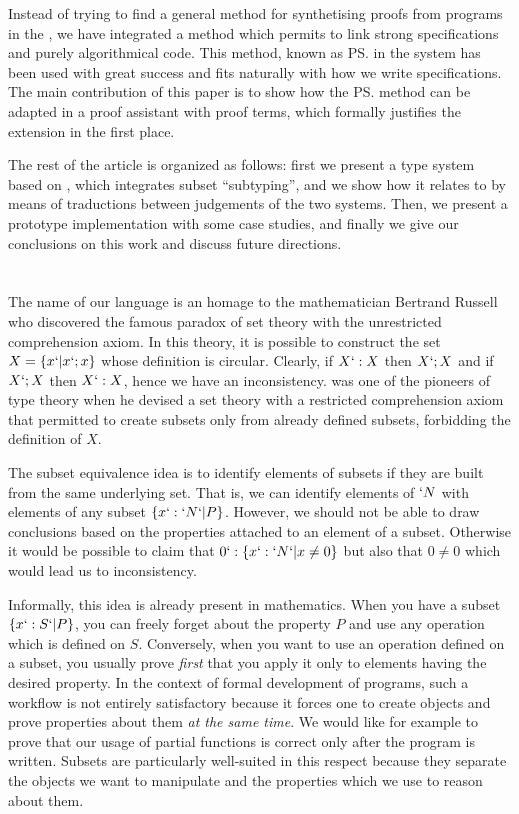 \documentclass{llncs}
\begin{document}
Instead of trying to find a general method for synthetising proofs from
programs in the \CICfull, we have integrated a method which permits to
link strong specifications and purely algorithmical code. This method,
known as \ps{} in the \PVS{} system has been used with great success and
fits naturally with how we write specifications. The main contribution
of this paper is to show how the \ps{} method can be adapted in a proof
assistant with proof terms, which formally justifies the extension in
the first place.

The rest of the article is organized as follows: first we present a
type system based on \CIC, which integrates subset ``subtyping'', and
we show how it relates to \CIC{} by means of traductions between
judgements of the two systems. Then, we present a prototype
implementation with some case studies, and finally we give our
conclusions on this work and discuss future directions.

\section{\Russell{}}
The name of our language is an homage to the mathematician Bertrand Russell who
discovered the famous paradox of set theory with the unrestricted
comprehension axiom. In this theory, it is possible to construct the set
$X = \{x `| x `; x\}$ whose definition is circular. Clearly, if $X `: X$
then $X `; X$ and if $X `; X$ then $X `: X$, hence we have an
inconsistency. \Russell{} was one of the pioneers of type theory when he
devised a set theory with a restricted comprehension axiom that
permitted to create subsets only from already defined subsets,
forbidding the definition of $X$. %

The subset equivalence idea is to identify elements of subsets if
they are built from the same underlying set. That is, we can identify
elements of $`N$ with elements of any subset $\{ x `: `N `| P \}$.
However, we should not be able to draw conclusions based on the
properties attached to an element of a subset. Otherwise it would be
possible to claim that $0 `: \{ x `: `N `| x \neq 0 \}$ but also that $0
\neq 0$ which would lead us to inconsistency. 

Informally, this idea is already present in mathematics. When you have a
subset $\{ x `: S `| P \}$, you can freely forget about the property $P$
and use any operation which is defined on $S$. Conversely, when you
want to use an operation defined on a subset, you usually prove \emph{first}
that you apply it only to elements having the desired property. 
In the context of formal development of programs, such a workflow is not
entirely satisfactory because it forces one to create objects and prove
properties about them \emph{at the same time}. We would like for example
to prove that our usage of partial functions is correct only after the
program is written. Subsets are particularly well-suited in this respect
because they separate the objects we want to manipulate and the
properties which we use to reason about them.
\end{document}

